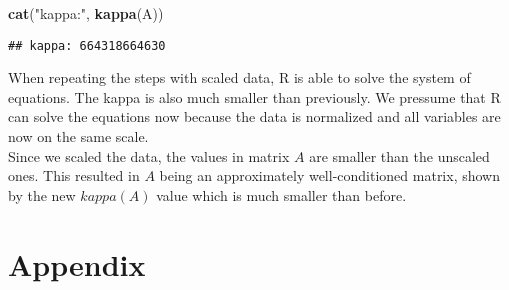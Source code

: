 \documentclass[]{article}
\newenvironment{Shaded}{\begin{snugshade}}{\end{snugshade}}
\newcommand{\KeywordTok}[1]{\textcolor[rgb]{0.13,0.29,0.53}{\textbf{#1}}}
\newcommand{\NormalTok}[1]{#1}
\newcommand{\StringTok}[1]{\textcolor[rgb]{0.31,0.60,0.02}{#1}}
\begin{document}
\begin{Shaded}
\begin{Highlighting}[]
\KeywordTok{cat}\NormalTok{(}\StringTok{"kappa:"}\NormalTok{, }\KeywordTok{kappa}\NormalTok{(A))}
\end{Highlighting}
\end{Shaded}

\begin{verbatim}
## kappa: 664318664630
\end{verbatim}

When repeating the steps with scaled data, R is able to solve the system
of equations. The kappa is also much smaller than previously. We
pressume that R can solve the equations now because the data is
normalized and all variables are now on the same scale.\\
Since we scaled the data, the values in matrix \(A\) are smaller than
the unscaled ones. This resulted in \(A\) being an approximately
well-conditioned matrix, shown by the new \(kappa(A)\) value which is
much smaller than before.

\newpage

\hypertarget{appendix}{%
\section{Appendix}\label{appendix}}
\end{document}
